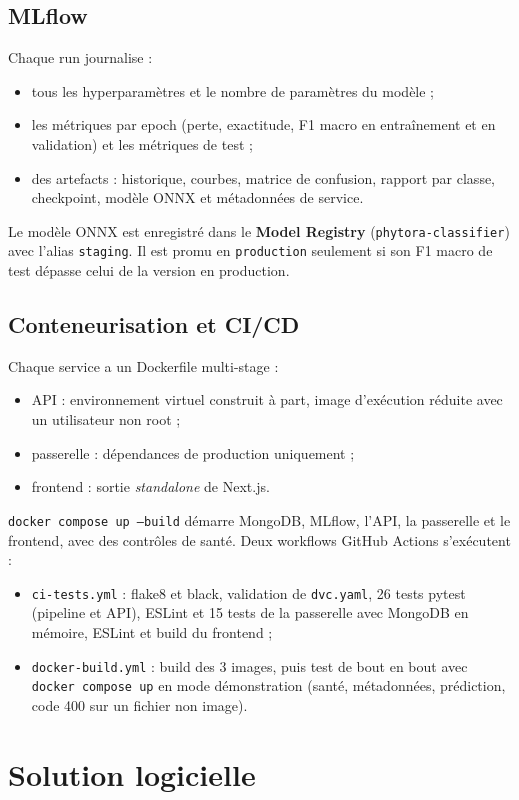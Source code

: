 \documentclass[11pt,a4paper]{article}
\begin{document}
\subsection{MLflow}
Chaque run journalise :
\begin{itemize}
  \item tous les hyperparamètres et le nombre de paramètres du modèle ;
  \item les métriques par epoch (perte, exactitude, F1 macro en entraînement et en validation) et les métriques de test ;
  \item des artefacts : historique, courbes, matrice de confusion, rapport par classe, checkpoint, modèle ONNX et métadonnées de service.
\end{itemize}
Le modèle ONNX est enregistré dans le \textbf{Model Registry} (\texttt{phytora-classifier}) avec l'alias \texttt{staging}. Il est promu en \texttt{production} seulement si son F1 macro de test dépasse celui de la version en production.

\subsection{Conteneurisation et CI/CD}
Chaque service a un Dockerfile multi-stage :
\begin{itemize}
  \item API : environnement virtuel construit à part, image d'exécution réduite avec un utilisateur non root ;
  \item passerelle : dépendances de production uniquement ;
  \item frontend : sortie \emph{standalone} de Next.js.
\end{itemize}
\texttt{docker compose up --build} démarre MongoDB, MLflow, l'API, la passerelle et le frontend, avec des contrôles de santé. Deux workflows GitHub Actions s'exécutent :
\begin{itemize}
  \item \texttt{ci-tests.yml} : flake8 et black, validation de \texttt{dvc.yaml}, 26 tests pytest (pipeline et API), ESLint et 15 tests de la passerelle avec MongoDB en mémoire, ESLint et build du frontend ;
  \item \texttt{docker-build.yml} : build des 3 images, puis test de bout en bout avec \texttt{docker compose up} en mode démonstration (santé, métadonnées, prédiction, code 400 sur un fichier non image).
\end{itemize}

\section{Solution logicielle}
\end{document}
